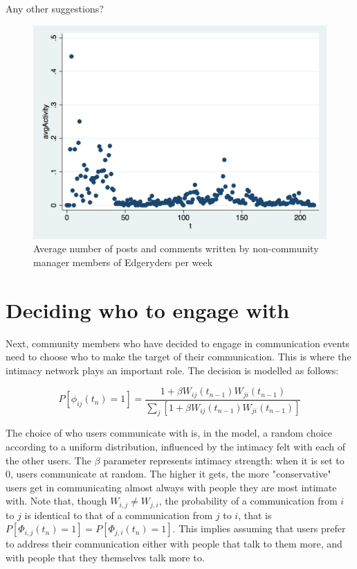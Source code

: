 \documentclass{article}
\begin{document}
Any other suggestions?

\begin{figure}
	\includegraphics[width = \textwidth]{avgActivity_ER} 
	\caption{Average number of posts and comments written by non-community manager members of Edgeryders per week}
	\label{fig:avgActivityER}

\end{figure}

\section{Deciding who to engage with}

Next, community members who have decided to engage in communication events need to choose who to make the target of their communication. This is where the intimacy network plays an important role. The decision is modelled as follows:

\begin{equation}
	P [\phi_{ij}(t_n) = 1] = \frac{1 + \beta W_{ij}(t_{n-1}) W_{ji}(t_{n-1})}{\sum_j [1 + \beta W_{ij}(t_{n-1}) W_{ji}(t_{n-1})]}
	\label{eq:mainEngine}
 \end {equation}

The choice of who users communicate with is, in the model, a random choice according to a uniform distribution, influenced by the intimacy felt with each of the other users. The $\beta$ parameter represents intimacy strength: when it is set to 0, users communicate at random. The higher it gets, the more "conservative" users get in communicating almost always with people they are most intimate with. Note that, though $W_{i,j} \neq W_{j,i}$, the probability of a communication from $i$ to $j$ is identical to that of a communication from $j$ to $i$, that is $P [\Phi_{i,j}(t_n) = 1] = P [\Phi_{j,i}(t_n) = 1]$. This implies assuming that users prefer to address their communication either with people that talk to them more, and with people that they themselves talk more to. 
\end{document}
